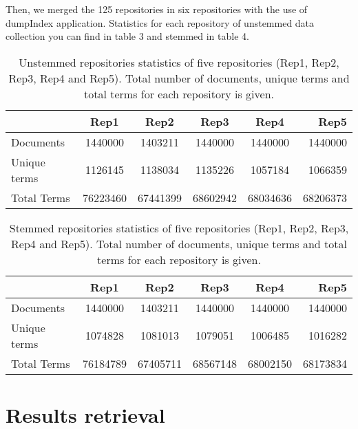 Then, we merged the 125 repositories in six repositories with the use of dumpIndex application. Statistics for each repository of unstemmed data collection you can find in table 3 and stemmed in table 4.




\begin{table}[H]
\begin{center}
\footnotesize
\caption{Unstemmed repositories statistics of five repositories (Rep1, Rep2, Rep3, Rep4 and Rep5). Total number of documents, unique terms and total terms for each repository is given.}
\begin{tabular}{lccccr}
\toprule
&Rep1 & Rep2 & Rep3 & Rep4 & Rep5 \\
\midrule
Documents & 1440000 & 1403211 & 1440000 & 1440000 & 1440000 \\
Unique terms & 1126145 & 1138034 & 1135226 & 1057184 & 1066359\\
Total Terms & 76223460 & 67441399 & 68602942 & 68034636 & 68206373\\
\bottomrule
\end{tabular}
\end{center}
\end{table}



\begin{table}[H]
\begin{center}
\footnotesize
\caption{Stemmed repositories statistics of five repositories (Rep1, Rep2, Rep3, Rep4 and Rep5). Total number of documents, unique terms and total terms for each repository is given.}
\begin{tabular}{lccccr}
\toprule
&Rep1 & Rep2 & Rep3 & Rep4 & Rep5 \\
\midrule
Documents & 1440000 & 1403211 & 1440000 & 1440000 & 1440000 \\
Unique terms & 1074828 & 1081013 & 1079051 & 1006485 & 1016282 \\
Total Terms & 76184789 & 67405711 & 68567148 & 68002150 & 68173834 \\
\bottomrule
\end{tabular}
\end{center}
\end{table}




\section{Results retrieval}

